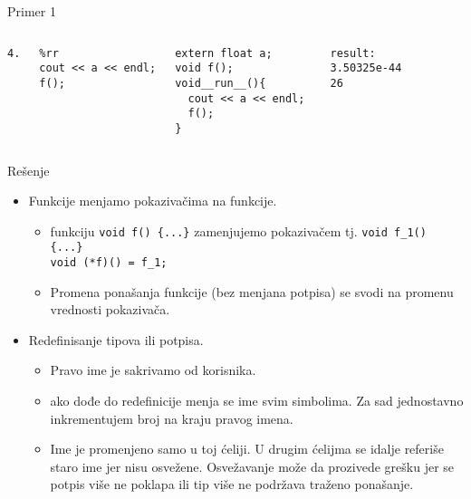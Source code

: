 \documentclass{beamer}
\begin{document}
\begin{frame}[fragile] {Primer 1}
    \begin{columns}
    \column[t]{0.1cm}
\begin{verbatim}
4.
\end{verbatim}
      \column[t]{4.5cm}
\begin{verbatim}
%rr
cout << a << endl;
f();
\end{verbatim}
      \column[t]{4.5cm}
\begin{verbatim}
extern float a;
void f();
void__run__(){ 
  cout << a << endl; 
  f();
}
\end{verbatim}
    \pause
    \column[t]{1.5cm}
\begin{verbatim}
result:
3.50325e-44
26
\end{verbatim}
    \end{columns}

\end{frame}

\begin{frame}[fragile]{Rešenje}
  \begin{itemize}

    \item{ Funkcije menjamo pokazivačima na funkcije.
        \pause
        \begin{itemize}
          \item{funkciju \verb|void f() {...}| zamenjujemo pokazivačem
              tj. \verb|void f_1() {...} | \\ \verb|void (*f)() = f_1;|
            }
        \pause
      \item{Promena ponašanja funkcije (bez menjana potpisa) se svodi
        na promenu vrednosti  pokazivača.}
        \end{itemize}
        \pause
      }

    \item{ Redefinisanje tipova ili potpisa.
        \begin{itemize}
          \item{ Pravo ime je sakrivamo od korisnika. \pause
            }
          \item{ ako dođe do redefinicije menja se ime svim simbolima.
              Za sad jednostavno inkrementujem broj na kraju pravog
            imena. \pause
            }
          \item { Ime je promenjeno samo u toj ćeliji. U drugim ćelijma se idalje referiše staro ime jer nisu osvežene. Osvežavanje
              može da prozivede grešku jer se potpis više ne poklapa
              ili tip više ne podržava traženo ponašanje.
            }
        \end{itemize}
      }


  \end{itemize}


\end{frame}
\end{document}
